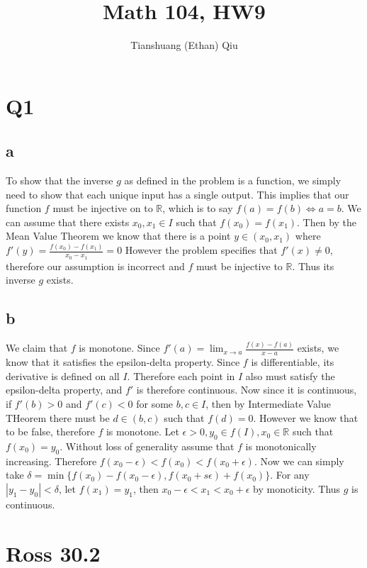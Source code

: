 \documentclass[12pt]{article}
\author{Tianshuang (Ethan) Qiu}
\newcommand{\R}{\mathbb{R}}
\begin{document}
\title{Math 104, HW9}
\maketitle
\newpage

\section{Q1}
\subsection{a}
To show that the inverse $g$ as defined in the problem is a function, we simply need to show that each unique input has a single output. This implies that our function $f$ must be injective on to $\R$, which is to say $f(a) = f(b) \iff a = b$.
\newline
We can assume that there exists $x_0, x_1 \in I$ such that $f(x_0) = f(x_1)$.
Then by the Mean Value Theorem we know that there is a point $y \in (x_0, x_1)$ where $f'(y) = \frac{f(x_0)-f(x_1)}{x_0-x_1}=0$
However the problem specifies that $f'(x) \not= 0$, therefore our assumption is incorrect and $f$ must be injective to $\R$. Thus its inverse $g$ exists.

\subsection{b}
We claim that $f$ is monotone. Since $f'(a) = \lim_{x \to a}\frac{f(x)-f(a)}{x-a}$ exists, we know that it satisfies the epsilon-delta property. Since $f$ is differentiable, its derivative is defined on all $I$. Therefore each point in $I$ also must satisfy the epsilon-delta property, and $f'$ is therefore continuous. Now since it is continuous, if $f'(b)>0$ and $f'(c)<0$ for some $b,c \in I$, then by Intermediate Value THeorem there must be $d \in (b,c)$ such that $f(d)=0$. However we know that to be false, therefore $f$ is monotone.
\newline
Let $\epsilon > 0, y_0 \in f(I), x_0 \in \R$ such that $f(x_0)=y_0$. Without loss of generality assume that $f$ is monotonically increasing. Therefore $f(x_0-\epsilon) < f(x_0) < f(x_0+\epsilon)$.
Now we can simply take $\delta = \min\{f(x_0)-f(x_0-\epsilon), f(x_0+s\epsilon) + f(x_0)\}$. For any $|y_1-y_0|<\delta$, let $f(x_1)=y_1$, then $x_0-\epsilon < x_1 < x_0 + \epsilon$ by monoticity. Thus $g$ is continuous.
\newpage


\section{Ross 30.2}
\end{document}

